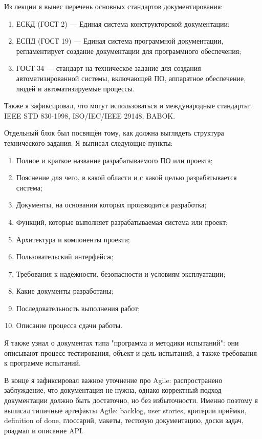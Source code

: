 Из лекции я вынес перечень основных стандартов документирования:
\begin{enumerate}[label=\arabic*)]
  \item ЕСКД (ГОСТ 2) — Единая система конструкторской документации;
  \item ЕСПД (ГОСТ 19) — Единая система программной документации, регламентирует создание документации для программного обеспечения;
  \item ГОСТ 34 — стандарт на техническое задание для создания автоматизированной системы, включающей ПО, аппаратное обеспечение, людей и автоматизируемые процессы.
\end{enumerate}
Также я зафиксировал, что могут использоваться и международные стандарты: IEEE STD 830-1998, ISO/IEC/IEEE 29148, BABOK.

Отдельный блок был посвящён тому, как должна выглядеть структура технического задания. Я выписал следующие пункты:
\begin{enumerate}[label=\arabic*)]
  \item Полное и краткое название разрабатываемого ПО или проекта;
  \item Пояснение для чего, в какой области и с какой целью разрабатывается система;
  \item Документы, на основании которых производится разработка;
  \item Функций, которые выполняет разрабатываемая система или проект;
  \item Архитектура и компоненты проекта;
  \item Пользовательский интерфейсж;
  \item Требования к надёжности, безопасности и условиям эксплуатации;
  \item Какие документы разработаны;
  \item Последовательность выполнения работ;
  \item Описание процесса сдачи работы.
\end{enumerate}

Я также узнал о документах типа "программа и методики испытаний": они описывают процесс тестирования, объект и цель испытаний, а также требования к программе испытаний.

В конце я зафиксировал важное уточнение про Agile: распространено заблуждение, что документация не нужна, однако корректный подход — документации должно быть достаточно, но без избыточности.
Именно поэтому я выписал типичные артефакты Agile: backlog, user stories, критерии приёмки, definition of done, глоссарий, макеты, тестовую документацию, доски задач, роадмап и описание API.

